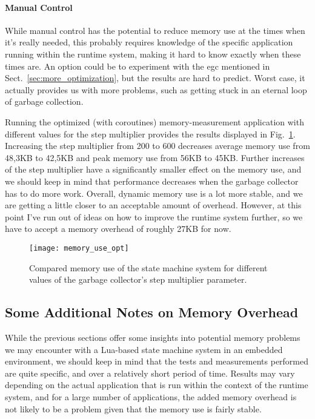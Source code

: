 \paragraph{Manual Control} While manual control has the potential to reduce memory use at the times when it's really needed, this probably requires knowledge of the specific application running within the runtime system, making it hard to know exactly when these times are. An option could be to experiment with the \gls{egc} mentioned in Sect.~\ref{sec:more_optimization}, but the results are hard to predict. Worst case, it actually provides us with more problems, such as getting stuck in an eternal loop of garbage collection.

\noindent
Running the optimized (with coroutines) memory-measurement application with different values for the step multiplier provides the results displayed in Fig.~\ref{fig:memory_use_opt}. Increasing the step multiplier from 200 to 600 decreases average memory use from 48,3KB to 42,5KB and peak memory use from 56KB to 45KB. Further increases of the step multiplier have a significantly smaller effect on the memory use, and we should keep in mind that performance decreases when the garbage collector has to do more work. Overall, dynamic memory use is a lot more stable, and we are getting a little closer to an acceptable amount of overhead. However, at this point I've run out of ideas on how to improve the runtime system further, so we have to accept a memory overhead of roughly 27KB for now.

\begin{figure}[htp]
	\centering
	\texttt{[image: memory\_use\_opt]}
	\caption[Results of tinkering with the garbage collector for the state machine application]{Compared memory use of the state machine system for different values of the garbage collector's step multiplier parameter.}
	\label{fig:memory_use_opt}
\end{figure}

\subsection{Some Additional Notes on Memory Overhead}
\label{sec:mem_overhead_notes}
While the previous sections offer some insights into potential memory problems we may encounter with a Lua-based state machine system in an embedded environment, we should keep in mind that the tests and measurements performed are quite specific, and over a relatively short period of time. Results may vary depending on the actual application that is run within the context of the runtime system, and for a large number of applications, the added memory overhead is not likely to be a problem given that the memory use is fairly stable.

